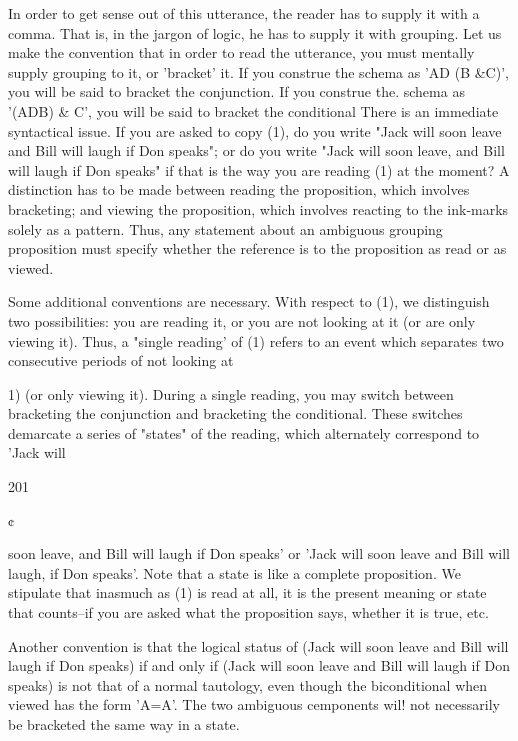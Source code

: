 \documentclass[10pt,twoside]{memoir}
\begin{document}
\begin{enumerate}
{\begin{enumerate}
\begin{sysrules}
\begin{sysrules}
\begin{sysrules}
\begin{sysrules}
{\begin{enumerate}
{{{{{{{{{In order to get sense out of this utterance, the reader has to supply it with a 
comma. That is, in the jargon of logic, he has to supply it with grouping. Let 
us make the convention that in order to read the utterance, you must 
mentally supply grouping to it, or 'bracket' it. If you construe the schema 
as 'AD (B &C)', you will be said to bracket the conjunction. If you construe 
the. schema as '(ADB) & C', you will be said to bracket the conditional There 
is an immediate syntactical issue. If you are asked to copy (1), do you write 
"Jack will soon leave and Bill will laugh if Don speaks"; or do you write 
"Jack will soon leave, and Bill will laugh if Don speaks" if that is the way 
you are reading (1) at the moment? A distinction has to be made between 
reading the proposition, which involves bracketing; and viewing the 
proposition, which involves reacting to the ink-marks solely as a pattern. 
Thus, any statement about an ambiguous grouping proposition must specify 
whether the reference is to the proposition as read or as viewed. 

Some additional conventions are necessary. With respect to (1), we 
distinguish two possibilities: you are reading it, or you are not looking at it 
(or are only viewing it). Thus, a "single reading' of (1) refers to an event 
which separates two consecutive periods of not looking at {1) (or only 
viewing it). During a single reading, you may switch between bracketing the 
conjunction and bracketing the conditional. These switches demarcate a 
series of "states" of the reading, which alternately correspond to 'Jack will 


201 


¢ 


soon leave, and Bill will laugh if Don speaks' or 'Jack will soon leave and Bill 
will laugh, if Don speaks'. Note that a state is like a complete proposition. 
We stipulate that inasmuch as (1) is read at all, it is the present meaning or 
state that counts--if you are asked what the proposition says, whether it is 
true, etc. 

Another convention is that the logical status of 
(Jack will soon leave and Bill will laugh if Don speaks) if and only if (Jack 
will soon leave and Bill will laugh if Don speaks) 
is not that of a normal tautology, even though the biconditional when 
viewed has the form 'A=A'. The two ambiguous cemponents wil! not 
necessarily be bracketed the same way in a state. 

}}}}}}}}}}
\end{enumerate}}
\end{sysrules}
\end{sysrules}
\end{sysrules}
\end{sysrules}
\end{enumerate}}
\end{enumerate}
\end{document}
